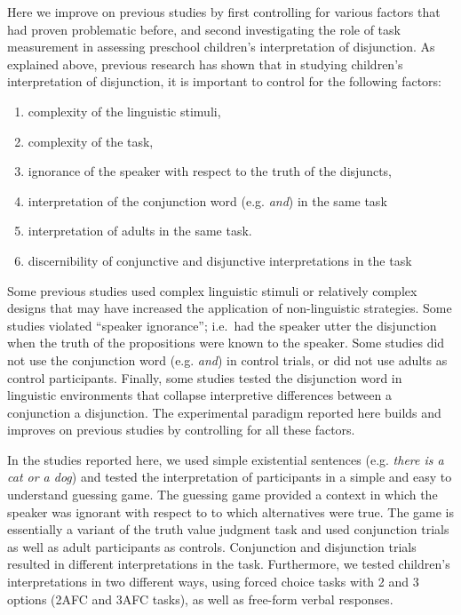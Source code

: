 \documentclass[floatsintext,man]{apa6}
\providecommand{\tightlist}{%
  \setlength{\itemsep}{0pt}\setlength{\parskip}{0pt}}
\theoremstyle{definition}
\theoremstyle{definition}
\theoremstyle{definition}
\theoremstyle{remark}
\begin{document}
Here we improve on previous studies by first controlling for various
factors that had proven problematic before, and second investigating the
role of task measurement in assessing preschool children's
interpretation of disjunction. As explained above, previous research has
shown that in studying children's interpretation of disjunction, it is
important to control for the following factors:

\begin{enumerate}
\def\labelenumi{\arabic{enumi}.}
\tightlist
\item
  complexity of the linguistic stimuli,
\item
  complexity of the task,
\item
  ignorance of the speaker with respect to the truth of the disjuncts,
\item
  interpretation of the conjunction word (e.g. \emph{and}) in the same
  task
\item
  interpretation of adults in the same task.
\item
  discernibility of conjunctive and disjunctive interpretations in the
  task
\end{enumerate}

Some previous studies used complex linguistic stimuli or relatively
complex designs that may have increased the application of
non-linguistic strategies. Some studies violated \enquote{speaker
ignorance}; i.e.~had the speaker utter the disjunction when the truth of
the propositions were known to the speaker. Some studies did not use the
conjunction word (e.g. \emph{and}) in control trials, or did not use
adults as control participants. Finally, some studies tested the
disjunction word in linguistic environments that collapse interpretive
differences between a conjunction a disjunction. The experimental
paradigm reported here builds and improves on previous studies by
controlling for all these factors.

In the studies reported here, we used simple existential sentences (e.g.
\emph{there is a cat or a dog}) and tested the interpretation of
participants in a simple and easy to understand guessing game. The
guessing game provided a context in which the speaker was ignorant with
respect to to which alternatives were true. The game is essentially a
variant of the truth value judgment task and used conjunction trials as
well as adult participants as controls. Conjunction and disjunction
trials resulted in different interpretations in the task. Furthermore,
we tested children's interpretations in two different ways, using forced
choice tasks with 2 and 3 options (2AFC and 3AFC tasks), as well as
free-form verbal responses.
\end{document}
